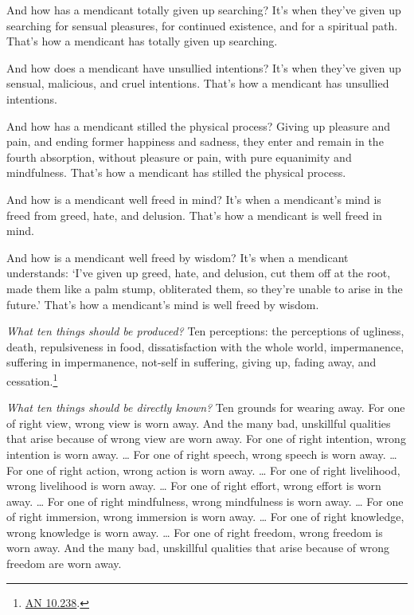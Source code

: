 \documentclass[12pt,openany]{book}%
\begin{document}
And how has a mendicant totally given up searching? It’s when they’ve given up searching for sensual pleasures, for continued existence, and for a spiritual path. That’s how a mendicant has totally given up searching. 

And how does a mendicant have unsullied intentions? It’s when they’ve given up sensual, malicious, and cruel intentions. That’s how a mendicant has unsullied intentions. 

And how has a mendicant stilled the physical process? Giving up pleasure and pain, and ending former happiness and sadness, they enter and remain in the fourth absorption, without pleasure or pain, with pure equanimity and mindfulness. That’s how a mendicant has stilled the physical process. 

And how is a mendicant well freed in mind? It’s when a mendicant’s mind is freed from greed, hate, and delusion. That’s how a mendicant is well freed in mind. 

And how is a mendicant well freed by wisdom? It’s when a mendicant understands: ‘I’ve given up greed, hate, and delusion, cut them off at the root, made them like a palm stump, obliterated them, so they’re unable to arise in the future.’ That’s how a mendicant’s mind is well freed by wisdom. 

\emph{What ten things should be produced?} Ten perceptions: the perceptions of ugliness, death, repulsiveness in food, dissatisfaction with the whole world, impermanence, suffering in impermanence, not-self in suffering, giving up, fading away, and cessation.\footnote{\href{https://suttacentral.net/an10.238/en/sujato}{AN 10.238}. } 

\emph{What ten things should be directly known?} Ten grounds for wearing away. For one of right view, wrong view is worn away. And the many bad, unskillful qualities that arise because of wrong view are worn away. For one of right intention, wrong intention is worn away. … For one of right speech, wrong speech is worn away. … For one of right action, wrong action is worn away. … For one of right livelihood, wrong livelihood is worn away. … For one of right effort, wrong effort is worn away. … For one of right mindfulness, wrong mindfulness is worn away. … For one of right immersion, wrong immersion is worn away. … For one of right knowledge, wrong knowledge is worn away. … For one of right freedom, wrong freedom is worn away. And the many bad, unskillful qualities that arise because of wrong freedom are worn away. 
\end{document}
